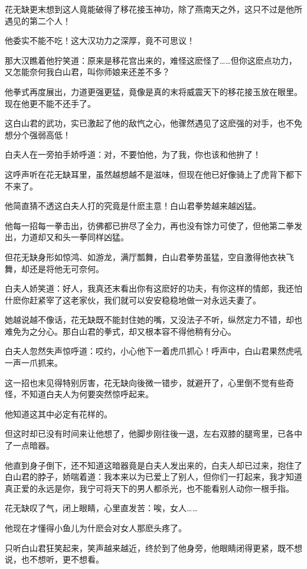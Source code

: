 \documentclass[12pt,oneside]{book}
\begin{document}
花无缺更末想到这人竟能破得了移花接玉神功，除了燕南天之外，这只不过是他所遇见的第二个人！

他委实不能不吃！这大汉功力之深厚，竟不可思议！

那大汉瞧着他狞笑道：原来是移花宫出来的，难怪这麽怪了\ldots\ldots 但你这麽点功力，又怎能奈何我白山君，叫你师娘来还差不多？

他拳式再度展出，力道更强更猛，竟像是真的末将威震天下的移花接玉放在眼里。现在他更不能不还手了。

这白山君的武功，实已激起了他的敌忾之心，他骤然遇见了这麽强的对手，也不免想分个强弱高低！

白夫人在一旁拍手娇呼道：对，不要怕他，为了我，你也该和他拚了！

这呼声听在花无缺耳里，虽然越想越不是滋味，但现在他已好像骑上了虎背下都下不来了。

他简直猜不透这白夫人打的究竟是什麽主意！白山君拳势越来越凶猛。

他每一招每一拳击出，彷佛都已拚尽了全力，再也没有馀力可使了，但他第二拳发出，力道却又和头一拳同样凶猛。

但花无缺身形如惊鸿、如游龙，满厅瓢舞，白山君拳势虽猛，空自激得他衣袂飞舞，却还是将他无可奈何。

白夫人娇笑道：好人，我真还末看出你有这麽好的功夫，有你这样的情郎，我还怕什麽你赶紧宰了这老家伙，我们就可以安安稳稳地做一对永远夫妻了。

她越说越不像话，花无缺既不能封住她的嘴，又没法子不听，纵然定力不错，却也难免为之分心。那白山君的拳式，却又根本容不得他稍有分心。

白夫人忽然失声惊呼道：哎约，小心他下一着虎爪抓心！呼声中，白山君果然虎吼一声一爪抓来。

这一招也末见得特别厉害，花无缺向後微一错步，就避开了，心里倒不觉有些奇怪，不知道白夫人为何要突然惊呼起来。

他知道这其中必定有花样的。

但这时却已没有时间来让他想了，他脚步刚往後一退，左右双膝的腿弯里，已各中了一点暗器。

他直到身子倒下，还不知道这暗器竟是白夫人发出来的，白夫人却已过来，抱住了白山君的脖子，娇喘着道：我本来以为已爱上了别人，但你们一打起来，我才知道真正爱的永远是你，我宁可将天下的男人都杀光，也不能看别人动你一根手指。

花无缺叹了气，闭上眼睛，心里直发苦：唉，女人\ldots\ldots{}

他现在才懂得小鱼儿为什麽会对女人那麽头疼了。

只听白山君狂笑起来，笑声越来越近，终於到了他身旁，他眼睛闭得更紧，既不想说，也不想听，更不想看。
\end{document}
